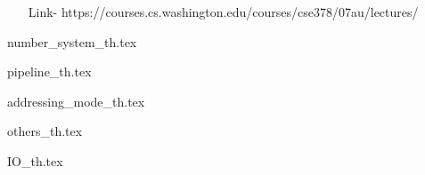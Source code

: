 
\begin{enumerate}
    \item[Link-] https://courses.cs.washington.edu/courses/cse378/07au/lectures/
\end{enumerate}

{number_system_th.tex}      \newpage

{pipeline_th.tex}            \newpage

{addressing_mode_th.tex}            \newpage

{others_th.tex}            \newpage

{IO_th.tex}            \newpage
